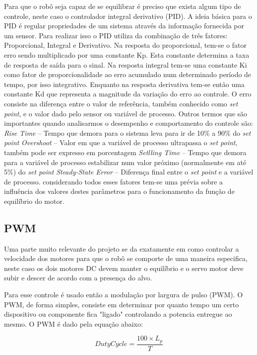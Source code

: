 Para que o robô seja capaz de se equilibrar é preciso que exista algum tipo de controle, neste caso o controlador integral derivativo (PID). A ideia básica para o PID é regular propriedades de um sistema através da informação fornecida por um sensor. Para realizar isso o PID utiliza da combinação de três fatores: Proporcional, Integral e Derivativo.
Na resposta do proporcional, tem-se o fator erro sendo multiplicado por uma constante Kp. Esta constante determina a taxa de resposta de saída para o sinal. Na resposta integral tem-se uma constante Ki como fator de proporcionalidade ao erro acumulado num determinado período de tempo, por isso integrativo. Enquanto na resposta derivativa tem-se então uma constante Kd que representa a magnitude da variação do erro ao controle.
O erro consiste na diferença entre o valor de referência, também conhecido como \textit{set point}, e o valor dado pelo sensor ou variável de processo. Outros termos que são importantes quando analisarmos o desempenho e comportamento do controle são:
\textit{Rise Time} – Tempo que demora para o sistema leva para ir de 10\% a 90\% do \textit{set point}
\textit{Overshoot} – Valor em que a variável de processo ultrapassa o \textit{set point}, também pode ser expresso em porcentagem
\textit{Setlling Time} – Tempo que demora para a variável de processo estabilizar num valor próximo (normalmente em até 5\%) do \textit{set point}
\textit{Steady-State Error} – Diferença final entre o \textit{set point} e a variável de processo.
considerando todos esses fatores tem-se uma prévia sobre a influência dos valores destes parâmetros para o funcionamento da função de equilíbrio do motor.

\subsection{PWM}

Uma parte muito relevante do projeto se da exatamente em como controlar a velocidade dos motores para que o robô se comporte de uma maneira especifica, neste caso os dois motores DC devem manter o equilíbrio e o servo motor deve subir e descer de acordo com a presença do alvo.

Para esse controle é usado então a modulação por largura de pulso (PWM). O PWM, de forma simples, consiste em determinar por quanto tempo um certo dispositivo ou componente fica "ligado" controlando a potencia entregue ao mesmo. O PWM é dado pela equação abaixo:

\begin{equation}
    DutyCycle = \frac{100\times L_p}{T}
\label{PWM}
\end{equation}

